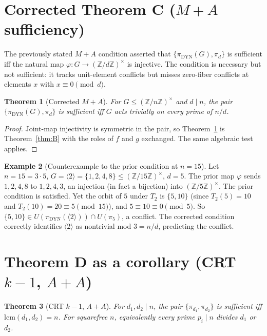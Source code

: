 \documentclass[11pt,reqno]{amsart}
\theoremstyle{plain}
\newtheorem{theorem}{Theorem}
\theoremstyle{definition}
\newtheorem{example}[theorem]{Example}
\newcommand{\Z}{\mathbb{Z}}
\newcommand{\Zns}{(\Z/n\Z)^{\times}}
\newcommand{\DYN}{\mathrm{DYN}}
\newcommand{\lcm}{\mathrm{lcm}}
\begin{document}
\section{Corrected Theorem C ($M{+}A$ sufficiency)} \label{sec:ma}

The previously stated $M{+}A$ condition asserted that $\{\pi_{\DYN}(G), \pi_d\}$ is sufficient iff the natural map $\varphi \colon G \to (\Z/d\Z)^{\times}$ is injective. The condition is necessary but not sufficient: it tracks unit-element conflicts but misses zero-fiber conflicts at elements $x$ with $x \equiv 0 \pmod d$.

\begin{theorem}[Corrected $M{+}A$] \label{thm:C}
For $G \leq \Zns$ and $d \mid n$, the pair $\{\pi_{\DYN}(G), \pi_d\}$ is sufficient iff $G$ acts trivially on every prime of $n/d$.
\end{theorem}

\begin{proof}
Joint-map injectivity is symmetric in the pair, so Theorem~\ref{thm:C} is Theorem~\ref{thm:B} with the roles of $f$ and $g$ exchanged. The same algebraic test applies.
\end{proof}

\begin{example}[Counterexample to the prior condition at $n=15$] \label{ex:n15}
Let $n = 15 = 3 \cdot 5$, $G = \langle 2 \rangle = \{1,2,4,8\} \leq (\Z/15\Z)^{\times}$, $d = 5$. The prior map $\varphi$ sends $1,2,4,8$ to $1,2,4,3$, an injection (in fact a bijection) into $(\Z/5\Z)^{\times}$. The prior condition is satisfied. Yet the orbit of $5$ under $T_2$ is $\{5,10\}$ (since $T_2(5) = 10$ and $T_2(10) = 20 \equiv 5 \pmod{15}$), and $5 \equiv 10 \equiv 0 \pmod 5$. So $\{5,10\} \in U(\pi_{\DYN}(\langle 2 \rangle)) \cap U(\pi_5)$, a conflict. The corrected condition correctly identifies $\langle 2 \rangle$ as nontrivial mod $3 = n/d$, predicting the conflict.
\end{example}

\section{Theorem D as a corollary (CRT $k-1$, $A{+}A$)} \label{sec:aa}

\begin{theorem}[CRT $k-1$, $A{+}A$] \label{thm:D}
For $d_1, d_2 \mid n$, the pair $\{\pi_{d_1}, \pi_{d_2}\}$ is sufficient iff $\lcm(d_1,d_2) = n$. For squarefree $n$, equivalently every prime $p_i \mid n$ divides $d_1$ or $d_2$.
\end{theorem}
\end{document}
